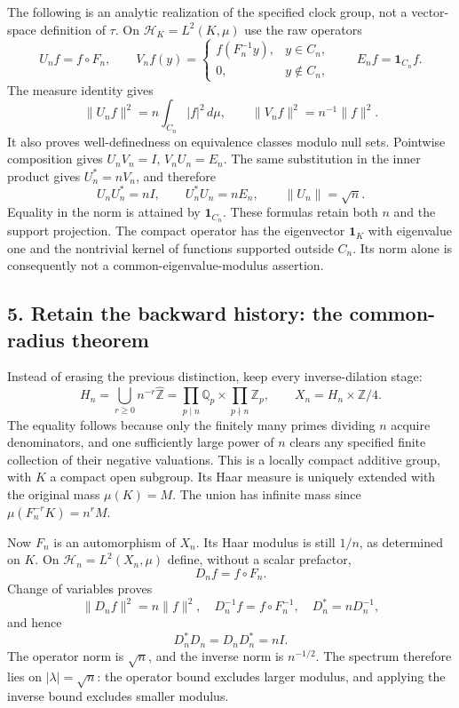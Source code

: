 \documentclass[
]{article}
\begin{document}
The following is an analytic realization of the specified clock group,
not a vector-space definition of \(\tau\). On
\(\mathcal H_K=L^2(K,\mu)\) use the raw operators \[
U_nf=f\circ F_n,
\qquad
V_nf(y)=
\begin{cases}f(F_n^{-1}y),&y\in C_n,\\0,&y\notin C_n,\end{cases}
\qquad E_nf=\mathbf1_{C_n}f.
\] The measure identity gives \[
\|U_nf\|^2=n\int_{C_n}|f|^2\,d\mu,
\qquad \|V_nf\|^2=n^{-1}\|f\|^2.
\] It also proves well-definedness on equivalence classes modulo null
sets. Pointwise composition gives \(U_nV_n=I\), \(V_nU_n=E_n\). The same
substitution in the inner product gives \(U_n^*=nV_n\), and therefore \[
U_nU_n^*=nI,\qquad U_n^*U_n=nE_n,\qquad \|U_n\|=\sqrt n.
\] Equality in the norm is attained by \(\mathbf1_{C_n}\). These
formulas retain both \(n\) and the support projection. The compact
operator has the eigenvector \(\mathbf1_K\) with eigenvalue one and the
nontrivial kernel of functions supported outside \(C_n\). Its norm alone
is consequently not a common-eigenvalue-modulus assertion.

\subsection{5. Retain the backward history: the common-radius
theorem}\label{retain-the-backward-history-the-common-radius-theorem}

Instead of erasing the previous distinction, keep every inverse-dilation
stage: \[
H_n=\bigcup_{r\ge0}n^{-r}\widehat{\mathbb Z}
=\prod_{p\mid n}\mathbb Q_p\times\prod_{p\nmid n}\mathbb Z_p,
\qquad X_n=H_n\times\mathbb Z/4.
\] The equality follows because only the finitely many primes dividing
\(n\) acquire denominators, and one sufficiently large power of \(n\)
clears any specified finite collection of their negative valuations.
This is a locally compact additive group, with \(K\) a compact open
subgroup. Its Haar measure is uniquely extended with the original mass
\(\mu(K)=M\). The union has infinite mass since \(\mu(F_n^{-r}K)=n^rM\).

Now \(F_n\) is an automorphism of \(X_n\). Its Haar modulus is still
\(1/n\), as determined on \(K\). On \(\mathcal H_n=L^2(X_n,\mu)\)
define, without a scalar prefactor, \[
D_nf=f\circ F_n.
\] Change of variables proves \[
\|D_nf\|^2=n\|f\|^2,\quad
D_n^{-1}f=f\circ F_n^{-1},\quad
D_n^*=nD_n^{-1},
\] and hence \[
\boxed{D_n^*D_n=D_nD_n^*=nI.}
\] The operator norm is \(\sqrt n\), and the inverse norm is
\(n^{-1/2}\). The spectrum therefore lies on \(|\lambda|=\sqrt n\): the
operator bound excludes larger modulus, and applying the inverse bound
excludes smaller modulus.
\end{document}
